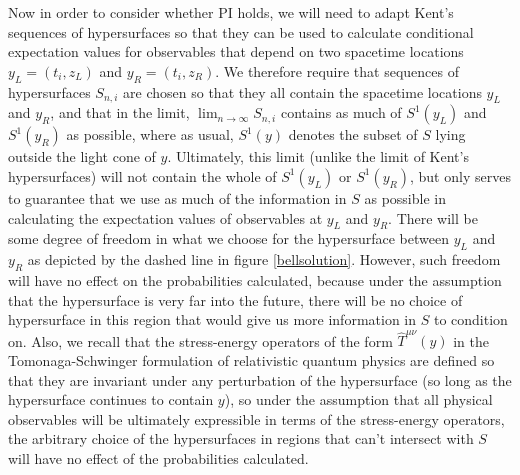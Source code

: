\documentclass[12pt]{report}
\begin{document}
Now in order to consider whether PI holds, we will need to adapt Kent's sequences of hypersurfaces so that they can be used to calculate conditional expectation values for observables that depend on two spacetime locations %
% 
$y_L=(t_i, z_L)$ and $y_R=(t_i,z_R)$.%
%
  We therefore require that sequences of hypersurfaces $S_{n,i}$ are chosen so that they all contain the spacetime locations $y_L$ and $y_R$, and that in the limit, $\lim_{n\rightarrow\infty}S_{n,i}$ contains as much of $S^1(y_L)$ and $S^1(y_R)$ as possible, where as usual, $S^1(y)$ denotes the subset of $S$ lying outside the light cone of $y$. Ultimately, this limit (unlike the limit of Kent's hypersurfaces) will not contain the whole of $S^1(y_L)$ or $S^1(y_R)$, but only serves to guarantee that we use as much of the information in $S$ as possible in calculating the expectation values of observables at $y_L$ and $y_R$. There will be some degree of freedom in what we choose for the hypersurface between $y_L$ and $y_R$ as depicted by the dashed line in figure \ref{bellsolution}. However, such freedom will have no effect on the probabilities calculated, because under the assumption that the hypersurface is very far into the future, there will be no choice of hypersurface in this region that would give us more information in $S$ to condition on. Also, we recall that the stress-energy operators of the form $\hat{T}^{\mu\nu}(y)$ in the Tomonaga-Schwinger formulation of relativistic quantum physics are defined so that they are invariant under any perturbation of the hypersurface (so long as the hypersurface continues to contain $y$), so under the assumption that all physical observables will be ultimately expressible in terms of the stress-energy operators, the arbitrary choice of the hypersurfaces in regions that can't intersect with $S$ will have no effect of the probabilities calculated. 
\end{document}
